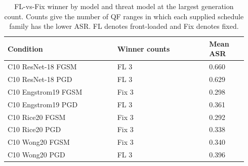 \begin{table}[t]
\caption{FL-vs-Fix winner by model and threat model at the largest generation count. Counts give the number of QF ranges in which each supplied schedule family has the lower ASR. FL denotes front-loaded and Fix denotes fixed.}
\label{tab:model-boundary}
\centering
\scriptsize
{\setlength{\tabcolsep}{2pt}
\begin{tabular}{@{}p{0.43\linewidth}p{0.36\linewidth}p{0.15\linewidth}@{}}
\hline
Condition & Winner counts & Mean ASR \\
\hline
C10 ResNet-18 FGSM & FL 3 & 0.660 \\
C10 ResNet-18 PGD & FL 3 & 0.629 \\
C10 Engstrom19 FGSM & Fix 3 & 0.298 \\
C10 Engstrom19 PGD & FL 3 & 0.361 \\
C10 Rice20 FGSM & Fix 3 & 0.292 \\
C10 Rice20 PGD & Fix 3 & 0.338 \\
C10 Wong20 FGSM & Fix 3 & 0.340 \\
C10 Wong20 PGD & FL 3 & 0.396 \\
\hline
\end{tabular}
}
\end{table}

